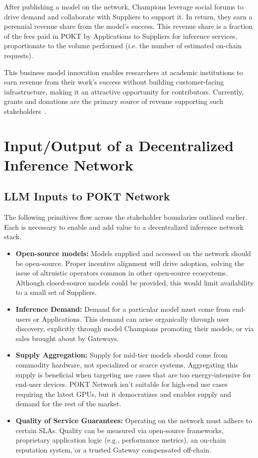 \documentclass[conference,compsoc]{IEEEtran}
\begin{document}
After publishing a model on the network, Champions leverage social forums to drive demand and collaborate with Suppliers to support it. In return, they earn a perennial revenue share from the model's success. This revenue share is a fraction of the fees paid in POKT by Applications to Suppliers for inference services, proportionate to the volume performed (i.e. the number of estimated on-chain requests).

This business model innovation enables researchers at academic institutions to earn revenue from their work's success without building customer-facing infrastructure, making it an attractive opportunity for contributors. Currently, grants and donations are the primary source of revenue supporting such stakeholders~\cite{lmsysDonationsLMSYS}.





\section{Input/Output of a Decentralized Inference Network}

\subsection{LLM Inputs to POKT Network}
The following primitives flow across the stakeholder boundaries outlined earlier. Each is necessary to enable and add value to a decentralized inference network stack.

\begin{itemize}
    \item \textbf{Open-source models:} Models supplied and accessed on the network should be open-source. Proper incentive alignment will drive adoption, solving the issue of altruistic operators common in other open-source ecosystems. Although closed-source models could be provided, this would limit availability to a small set of Suppliers.

    \item \textbf{Inference Demand:} Demand for a particular model must come from end-users or Applications. This demand can arise organically through user discovery, explicitly through model Champions promoting their models, or via sales brought about by Gateways.

    \item \textbf{Supply Aggregation:} Supply for mid-tier models should come from commodity hardware, not specialized or scarce systems. Aggregating this supply is beneficial when targeting use cases that are too energy-intensive for end-user devices. POKT Network isn't suitable for high-end use cases requiring the latest GPUs, but it democratizes and enables supply and demand for the rest of the market.

    \item \textbf{Quality of Service Guarantees:} Operating on the network must adhere to certain SLAs. Quality can be measured via open-source frameworks, proprietary application logic (e.g., performance metrics), an on-chain reputation system, or a trusted Gateway compensated off-chain.

\end{itemize}
\end{document}
